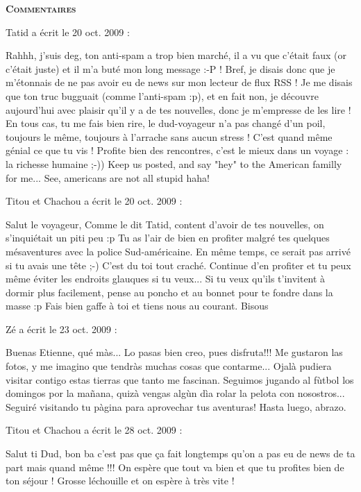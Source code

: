 \bigskip
\textbf{\textsc{Commentaires}}

 \medskip
Tatid a écrit le 20 oct. 2009 :
\begin{displayquote}
Rahhh, j'suis deg, ton anti-spam a trop bien marché, il a vu que c'était faux (or c'était juste) et il m'a buté mon long message :-P !
Bref, je disais donc que je m'étonnais de ne pas avoir eu de news sur mon lecteur de flux RSS ! Je me disais que ton truc bugguait (comme l'anti-spam :p), et en fait non, je découvre aujourd'hui avec plaisir qu'il y a de tes nouvelles, donc je m'empresse de les lire !
En tous cas, tu me fais bien rire, le dud-voyageur n'a pas changé d'un poil, toujours le même, toujours à l'arrache sans aucun stress ! C'est quand même génial ce que tu vis ! Profite bien des rencontres, c'est le mieux dans un voyage : la richesse humaine ;-))
Keep us posted, and say "hey" to the American familly for me... See, americans are not all stupid haha!
\end{displayquote}

 \medskip
Titou et Chachou a écrit le 20 oct. 2009 :
\begin{displayquote}
Salut le voyageur,
Comme le dit Tatid, content d'avoir de tes nouvelles, on s'inquiétait un piti peu :p
Tu as l'air de bien en profiter malgré tes quelques mésaventures avec la police Sud-américaine. En même temps, ce serait pas arrivé si tu avais une tête ;-) C'est du toi tout craché.
Continue d'en profiter et tu peux même éviter les endroits glauques si tu veux... Si tu veux qu'ils t'invitent à dormir plus facilement, pense au poncho et au bonnet pour te fondre dans la masse :p
Fais bien gaffe à toi et tiens nous au courant.
Bisous
\end{displayquote}

 \medskip
Zé a écrit le 23 oct. 2009 :
\begin{displayquote}
Buenas Etienne, qué màs...
Lo pasas bien creo, pues disfruta!!!
Me gustaron las fotos, y me imagino que tendràs muchas cosas que contarme...
Ojalà pudiera visitar contigo estas tierras que tanto me fascinan.
Seguimos jugando al fùtbol los domingos por la mañana, quizà vengas algùn dìa rolar la pelota con nosostros...
Seguiré visitando tu pàgina para aprovechar tus aventuras!
Hasta luego, abrazo.
\end{displayquote}

 \medskip
Titou et Chachou a écrit le 28 oct. 2009 :
\begin{displayquote}
Salut ti Dud,
bon ba c'est pas que ça fait longtemps qu'on a pas eu de news de ta part mais quand même !!! On espère que tout va bien et que tu profites bien de ton séjour !
Grosse léchouille et on espère à très vite !
\end{displayquote}

